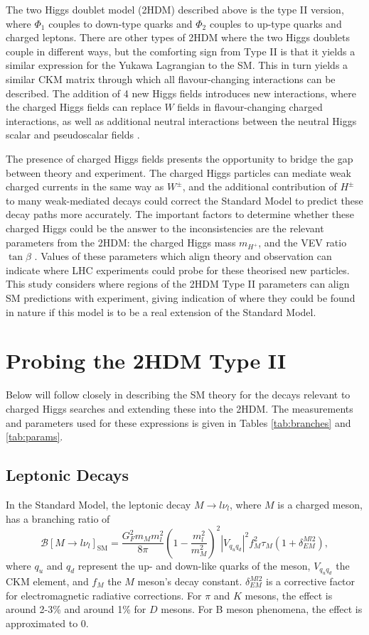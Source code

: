 \documentclass[a4paper,12pt]{article}
\begin{document}
The two Higgs doublet model (2HDM) described above is the type II version, where $\Phi_1$ couples to down-type quarks and $\Phi_2$ couples to up-type quarks and charged leptons. 
There are other types of 2HDM where the two Higgs doublets couple in different ways, but the comforting sign from Type II is that it yields a similar expression for the Yukawa Lagrangian to the SM. 
This in turn yields a similar CKM matrix through which all flavour-changing interactions can be described. 
The addition of 4 new Higgs fields introduces new interactions, where the charged Higgs fields can replace $W$ fields in flavour-changing charged interactions, as well as additional neutral interactions between the neutral Higgs scalar and pseudoscalar fields \cite{s}. 

The presence of charged Higgs fields presents the opportunity to bridge the gap between theory and experiment. 
The charged Higgs particles can mediate weak charged currents in the same way as $W^{\pm}$, and the additional contribution of $H^{\pm}$ to many weak-mediated decays could correct the Standard Model to predict these decay paths \cite{s} more accurately. 
The important factors to determine whether these charged Higgs could be the answer to the inconsistencies are the relevant parameters from the 2HDM: the charged Higgs mass $m_{H^+}$, and the VEV ratio $\tan\beta$ \cite{a}. 
Values of these parameters which align theory and observation can indicate where LHC experiments could probe for these theorised new particles. 
This study considers where regions of the 2HDM Type II parameters can align SM predictions with experiment, giving indication of where they could be found in nature if this model is to be a real extension of the Standard Model.

\section{Probing the 2HDM Type II}
\label{sec:probe}
Below will follow \cite{a} closely in describing the SM theory for the decays relevant to charged Higgs searches and extending these into the 2HDM. 
The measurements and parameters used for these expressions is given in Tables \ref{tab:branches} and \ref{tab:params}.

\subsection{Leptonic Decays}
\label{subsec:lep}
In the Standard Model, the leptonic decay $M\to l\nu_l$, where $M$ is a charged meson, has a branching ratio of
\begin{equation}
    \label{eq:mlv}
    \mathcal{B}[M\to l\nu_l]_{\text{SM}} = \frac{G_F^2m_Mm_l^2}{8\pi}\left(1-\frac{m_l^2}{m_M^2}\right)^2 |V_{q_uq_d}|^2f_M^2\tau_M(1+\delta_{EM}^{Ml2}),
\end{equation}
where $q_u$ and $q_d$ represent the up- and down-like quarks of the meson, $V_{q_uq_d}$ the CKM element, and $f_M$ the $M$ meson's decay constant.
$\delta_{EM}^{Ml2}$ is a corrective factor for electromagnetic radiative corrections. 
For $\pi$ and $K$ mesons, the effect is around 2-3\% and around 1\% for $D$ mesons.
For B meson phenomena, the effect is approximated to 0. 
\end{document}
